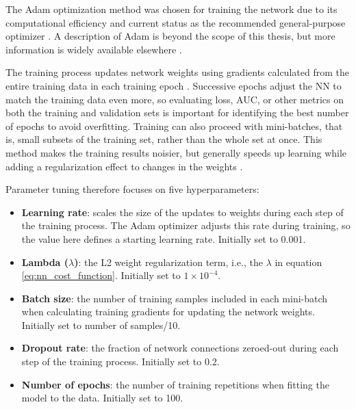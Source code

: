 The Adam optimization method was chosen for training the network due to its computational efficiency and current status as the recommended general-purpose optimizer \citep{brownlee_gentle_2017}. A description of Adam is beyond the scope of this thesis, but more information is widely available elsewhere \citep[e.g.,\ ][]{kingma_adam_2017}.

The training process updates network weights using gradients calculated from the entire training data in each training epoch \citep[p.\ 397]{hastie_elements_2009}. Successive epochs adjust the NN to match the training data even more, so evaluating loss, AUC, or other metrics on both the training and validation sets is important for identifying the best number of epochs to avoid overfitting. Training can also proceed with mini-batches, that is, small subsets of the training set, rather than the whole set at once. This method makes the training results noisier, but generally speeds up learning while adding a regularization effect to changes in the weights \citep{brownlee_how_2019}.  

Parameter tuning therefore focuses on five hyperparameters:
\begin{itemize}[itemsep=2pt]
    \item \textbf{Learning rate}: scales the size of the updates to weights during each step of the training process. The Adam optimizer adjusts this rate during training, so the value here defines a starting learning rate. Initially set to 0.001.
    \item \textbf{Lambda ($\lambda$)}: the L2 weight regularization term, i.e., the $\lambda$ in equation \ref{eq:nn_cost_function}. Initially set to $1\times10^{-4}$.
    \item \textbf{Batch size}: the number of training samples included in each mini-batch when calculating training gradients for updating the network weights. Initially set to number of samples/10.
    \item \textbf{Dropout rate}: the fraction of network connections zeroed-out during each step of the training process. Initially set to 0.2.
    \item \textbf{Number of epochs}: the number of training repetitions when fitting the model to the data. Initially set to 100.
\end{itemize}

